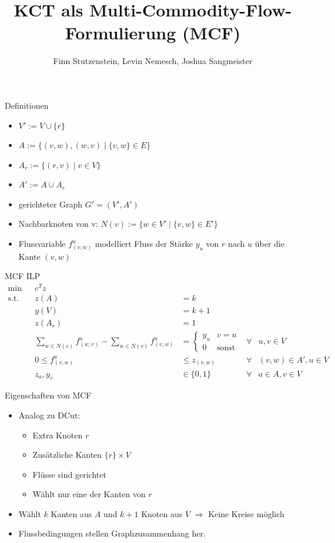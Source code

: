 \documentclass[ngerman,aspectratio=169,10pt]{beamer}
\title{KCT als Multi-Commodity-Flow-Formulierung (MCF)}
\author{Finn Stutzenstein, Levin Nemesch, Joshua Sangmeister}
\institute{Algorithm Engineering - Übung 4}
\begin{document}
	
\maketitle

\begin{frame}{Definitionen}
    \begin{itemize}
        \item $V' := V \cup \{r\}$
        \item $A := \{(v, w), (w, v) \mid \{v, w\} \in E\}$
        \item $A_r := \{(r, v) \mid v \in V\}$
        \item $A' := A \cup A_r$
        \item gerichteter Graph $G'=(V', A')$
        \item Nachbarknoten von v: $N(v) := \{w \in V'  \mid \{v, w\} \in E'\}$
        \item Flussvariable $f^u_{(v,w)}$ modelliert Fluss der Stärke $y_u$ von $r$ nach $u$ über die Kante $(v,w)$
    \end{itemize}
\end{frame}

\begin{frame}{MCF ILP}
	\begin{align*}
    	\min && c^Tz & &&\\
    	\text{s.t.} && z(A) &= k &&\\
    	&& y(V) &= k+1 &&\\
    	&& z(A_r) &= 1 &&\\
    	&& \sum_{w\in N(v)} f^u_{(w,v)} - \sum_{w\in N(v)} f^u_{(v,w)} &= \begin{cases}
    	        y_u & v=u\\
    	        0 & \text{sonst}
    	\end{cases} &\forall& u, v\in V\\
    	&& 0 \leq f^u_{(v,w)} &\leq z_{(v,w)} &\forall& (v, w) \in A', u \in V\\
    	&& z_a, y_v &\in \{0, 1\} &\forall& a \in A, v \in V
	\end{align*}
\end{frame}

\begin{frame}{Eigenschaften von MCF}
    \begin{itemize}
        \item Analog zu DCut:
        \begin{itemize}
            \item Extra Knoten $r$
            \item Zusätzliche Kanten $\{r\}\times V$
            \item Flüsse sind gerichtet
            \item Wählt nur eine der Kanten von $r$
        \end{itemize}
        \item Wählt $k$ Kanten aus $A$ und $k+1$ Knoten aus $V$ $\Rightarrow$ Keine Kreise möglich
        \item Flussbedingungen stellen Graphzusammenhang her.
    \end{itemize}
\end{frame}
\end{document}
